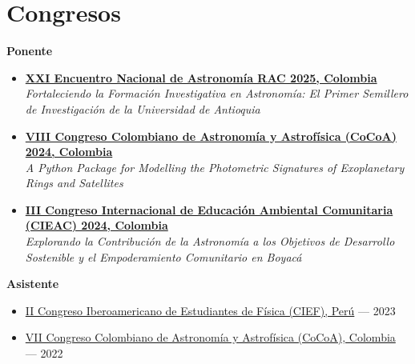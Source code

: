 \section*{Congresos}
\textbf{Ponente}
\begin{itemize}
    \item \href{https://rac.net.co/index.php/encuentro-rac-2025/}{\textbf{XXI Encuentro Nacional de Astronomía RAC 2025, Colombia}} \\
    \textit{Fortaleciendo la Formación Investigativa en Astronomía: El Primer Semillero de Investigación de la Universidad de Antioquia}

    \item \href{https://jupyterhd.redclara.net/event/45/}{\textbf{VIII Congreso Colombiano de Astronomía y Astrofísica (CoCoA) 2024, Colombia}} \\
    \textit{A Python Package for Modelling the Photometric Signatures of Exoplanetary Rings and Satellites}

    \item \href{https://www.unicordoba.edu.co/index.php/event/iii-congreso-internacional-de-educacion-ambiental-comunitaria-cieac-2024/}{\textbf{III Congreso Internacional de Educación Ambiental Comunitaria (CIEAC) 2024, Colombia}} \\
    \textit{Explorando la Contribución de la Astronomía a los Objetivos de Desarrollo Sostenible y el Empoderamiento Comunitario en Boyacá}
\end{itemize}

\textbf{Asistente}
\begin{itemize}
    \item \href{https://sites.google.com/view/congresoiberoamericanodefisica/seminars/2023?authuser=0}{II Congreso Iberoamericano de Estudiantes de Física (CIEF), Perú} — 2023
    \item \href{https://www.uptc.edu.co/sitio/portal/cal_not_eve/eventos/det/VII-Congreso-Colombiano-Astronomia-y-Astrofisica-COCOA-Tunja-2022-2022.09.21/?instancedate=1663765200000}{VII Congreso Colombiano de Astronomía y Astrofísica (CoCoA), Colombia} — 2022
\end{itemize}
